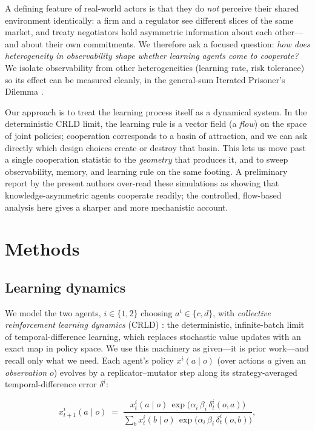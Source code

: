 \documentclass{article}
\begin{document}
A defining feature of real-world actors is that they do \emph{not} perceive their shared environment identically: a firm and a regulator see different slices of the same market, and treaty negotiators hold asymmetric information about each other---and about their own commitments. We therefore ask a focused question: \emph{how does heterogeneity in observability shape whether learning agents come to cooperate?} We isolate observability from other heterogeneities (learning rate, risk tolerance) so its effect can be measured cleanly, in the general-sum Iterated Prisoner's Dilemma \cite{9}.

Our approach is to treat the learning process itself as a dynamical system. In the deterministic CRLD limit, the learning rule is a vector field (a \emph{flow}) on the space of joint policies; cooperation corresponds to a basin of attraction, and we can ask directly which design choices create or destroy that basin. This lets us move past a single cooperation statistic to the \emph{geometry} that produces it, and to sweep observability, memory, and learning rule on the same footing. A preliminary report by the present authors over-read these simulations as showing that knowledge-asymmetric agents cooperate readily; the controlled, flow-based analysis here gives a sharper and more mechanistic account.

\section{Methods}

\subsection{Learning dynamics}

We model the two agents, $i\in\{1,2\}$ choosing $a^i\in\{c,d\}$, with \emph{collective reinforcement learning dynamics} (CRLD) \cite{10, 9, 14}: the deterministic, infinite-batch limit of temporal-difference learning, which replaces stochastic value updates with an exact map in policy space. We use this machinery as given---it is prior work---and recall only what we need. Each agent's policy $x^i(a\mid o)$ (over actions $a$ given an \emph{observation} $o$) evolves by a replicator--mutator step along its strategy-averaged temporal-difference error $\delta^i$:

\begin{equation}
x^i_{t+1}(a\mid o) \;=\;
\frac{x^i_{t}(a\mid o)\,\exp\!\big(\alpha_i\,\beta_i\,\delta^i_t(o,a)\big)}
{\sum_{b} x^i_{t}(b\mid o)\,\exp\!\big(\alpha_i\,\beta_i\,\delta^i_t(o,b)\big)},
\label{eq:update}
\end{equation}
\end{document}
